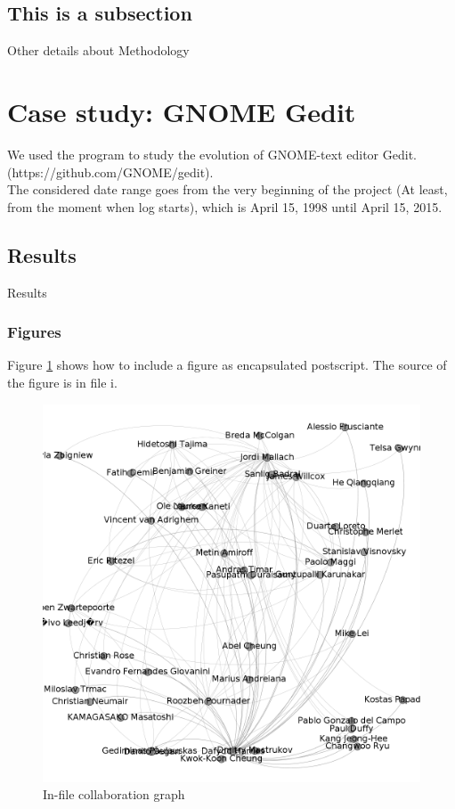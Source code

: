 \documentclass[a4paper]{article}
\begin{document}
\subsection{This is a subsection}

Other details about Methodology

\section{Case study: GNOME Gedit}

We used the program to study the evolution of GNOME-text editor Gedit. 
(https://github.com/GNOME/gedit).\\
The considered date range goes from the very beginning of the project (At
least, from the moment when log starts), which is April 15, 1998 until April
15, 2015.

\subsection{Results}

Results

\subsubsection{Figures}

Figure \ref{fig1} shows how to include a figure as encapsulated postscript.
The source of the figure is in file {i}.

\begin{figure}[ht]
\begin{center}
\includegraphics[scale=0.25]{graph1.png}
\caption{In-file collaboration graph}
\label{fig1}
\end{center}
\end{figure}
\end{document}
